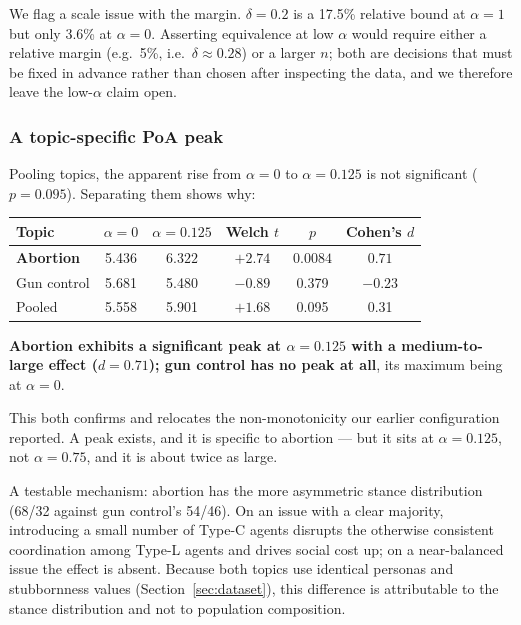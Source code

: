 We flag a scale issue with the margin. $\delta = 0.2$ is a 17.5\% relative bound at
$\alpha = 1$ but only 3.6\% at $\alpha = 0$. Asserting equivalence at low $\alpha$ would
require either a relative margin (e.g.\ 5\%, i.e.\ $\delta \approx 0.28$) or a larger
$n$; both are decisions that must be fixed in advance rather than chosen after
inspecting the data, and we therefore leave the low-$\alpha$ claim open.

\subsubsection{A topic-specific PoA peak}
\label{sec:res-peak}

Pooling topics, the apparent rise from $\alpha = 0$ to $\alpha = 0.125$ is not
significant ($p = 0.095$). Separating them shows why:

\begin{center}
\begin{tabular}{lccccc}
\toprule
Topic & $\alpha = 0$ & $\alpha = 0.125$ & Welch $t$ & $p$ & Cohen's $d$ \\
\midrule
\textbf{Abortion} & 5.436 & $\mathbf{6.322}$ & $+2.74$ & $\mathbf{0.0084}$ & $\mathbf{0.71}$ \\
Gun control       & 5.681 & 5.480 & $-0.89$ & 0.379 & $-0.23$ \\
Pooled            & 5.558 & 5.901 & $+1.68$ & 0.095 & 0.31 \\
\bottomrule
\end{tabular}
\end{center}

\textbf{Abortion exhibits a significant peak at $\alpha = 0.125$ with a medium-to-large
effect ($d = 0.71$); gun control has no peak at all}, its maximum being at $\alpha = 0$.

This both confirms and relocates the non-monotonicity our earlier configuration reported.
A peak exists, and it is specific to abortion --- but it sits at $\alpha = 0.125$, not
$\alpha = 0.75$, and it is about twice as large.

A testable mechanism: abortion has the more asymmetric stance distribution (68/32 against
gun control's 54/46). On an issue with a clear majority, introducing a small number of
Type-C agents disrupts the otherwise consistent coordination among Type-L agents and
drives social cost up; on a near-balanced issue the effect is absent. Because both topics
use identical personas and stubbornness values (Section~\ref{sec:dataset}), this
difference is attributable to the stance distribution and not to population composition.


